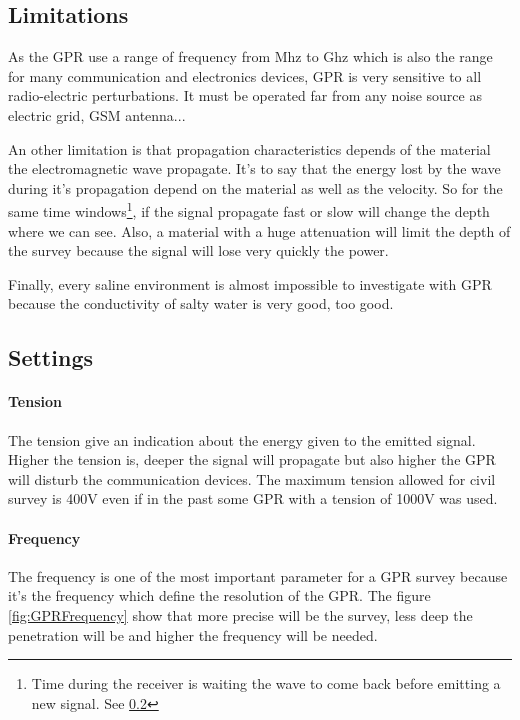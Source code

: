 \subsection{Limitations}

As the GPR use a range of frequency from Mhz to Ghz which is also the range for many communication and electronics devices, GPR is very sensitive to all radio-electric perturbations. It must be operated far from any noise source as electric grid, GSM antenna...

An other limitation is that propagation characteristics depends of the material the electromagnetic wave propagate. It's to say that the energy lost by the wave during it's propagation depend on the material as well as the velocity. So for the same time windows\footnote{Time during the receiver is waiting the wave to come back before emitting a new signal. See \ref{SubSection:settings}}, if the signal propagate fast or slow will change the depth where we can see. Also, a material with a huge attenuation will limit the depth of the survey because the signal will lose very quickly the power.

Finally, every saline environment is almost impossible to investigate with GPR because the conductivity of salty water is very good, too good.

\subsection{Settings} \label{SubSection:settings}


\paragraph{Tension} The tension give an indication about the energy given to the emitted signal. Higher the tension is, deeper the signal will propagate but also higher the GPR will disturb the communication devices. The maximum tension allowed for civil survey is 400V even if in the past some GPR with a tension of 1000V was used. 

\paragraph{Frequency} The frequency is one of the most important parameter for a GPR survey because it's the frequency which define the resolution of the GPR. The figure \ref{fig:GPRFrequency} show that more precise will be the survey, less deep the penetration will be and higher the frequency will be needed. 

